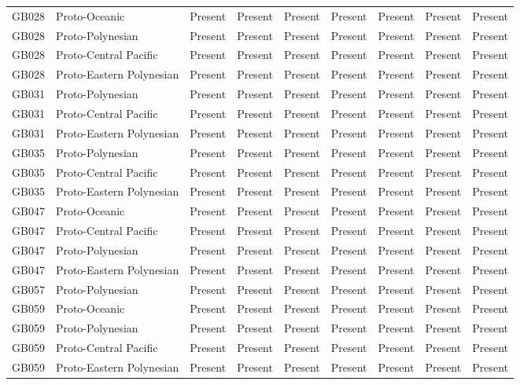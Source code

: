 \begin{longtable}{p{1.5cm}p{2.5cm}p{2.5cm}p{2.5cm}p{2.5cm}p{2.5cm}p{2.5cm}p{2.5cm}p{2.5cm}}
  GB028 & Proto-Oceanic & Present & Present & Present & Present & Present & Present & Present \\ 
  GB028 & Proto-Polynesian & Present & Present & Present & Present & Present & Present & Present \\ 
  GB028 & Proto-Central Pacific & Present & Present & Present & Present & Present & Present & Present \\ 
  GB028 & Proto-Eastern Polynesian & Present & Present & Present & Present & Present & Present & Present \\ 
  GB031 & Proto-Polynesian & Present & Present & Present & Present & Present & Present & Present \\ 
  GB031 & Proto-Central Pacific & Present & Present & Present & Present & Present & Present & Present \\ 
  GB031 & Proto-Eastern Polynesian & Present & Present & Present & Present & Present & Present & Present \\ 
  GB035 & Proto-Polynesian & Present & Present & Present & Present & Present & Present & Present \\ 
  GB035 & Proto-Central Pacific & Present & Present & Present & Present & Present & Present & Present \\ 
  GB035 & Proto-Eastern Polynesian & Present & Present & Present & Present & Present & Present & Present \\ 
  GB047 & Proto-Oceanic & Present & Present & Present & Present & Present & Present & Present \\ 
  GB047 & Proto-Central Pacific & Present & Present & Present & Present & Present & Present & Present \\ 
  GB047 & Proto-Polynesian & Present & Present & Present & Present & Present & Present & Present \\ 
  GB047 & Proto-Eastern Polynesian & Present & Present & Present & Present & Present & Present & Present \\ 
  GB057 & Proto-Polynesian & Present & Present & Present & Present & Present & Present & Present \\ 
  GB059 & Proto-Oceanic & Present & Present & Present & Present & Present & Present & Present \\ 
  GB059 & Proto-Polynesian & Present & Present & Present & Present & Present & Present & Present \\ 
  GB059 & Proto-Central Pacific & Present & Present & Present & Present & Present & Present & Present \\ 
  GB059 & Proto-Eastern Polynesian & Present & Present & Present & Present & Present & Present & Present \\ 

\end{longtable}
